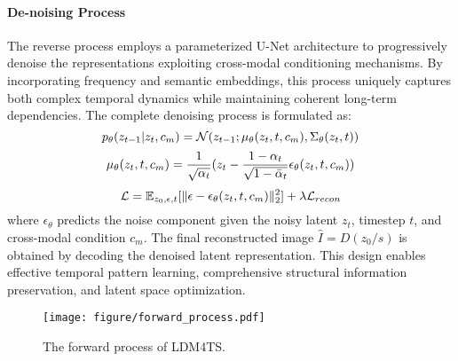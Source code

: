 \paragraph{De-noising Process}
The reverse process employs a parameterized U-Net architecture to progressively denoise the representations exploiting cross-modal conditioning mechanisms. By incorporating frequency and semantic embeddings, this process uniquely captures both complex temporal dynamics while maintaining coherent long-term dependencies. The complete denoising process is formulated as:
\begin{equation}
\small
    p_\theta(z_{t-1}|z_t,c_m) = \mathcal{N}(z_{t-1}; \mu_\theta(z_t,t,c_m), \Sigma_\theta(z_t,t))
\end{equation}
\begin{equation}
\small
    \mu_\theta(z_t,t,c_m) = \frac{1}{\sqrt{\alpha_t}}(z_t - \frac{1-\alpha_t}{\sqrt{1-\bar{\alpha}_t}}\epsilon_\theta(z_t,t,c_m))
\end{equation}
\begin{equation}
\small
    \mathcal{L} = \mathbb{E}_{z_0,\epsilon,t}[\|\epsilon - \epsilon_\theta(z_t,t,c_m)\|_2^2] + \lambda\mathcal{L}_{recon}
\end{equation}
where $\epsilon_\theta$ predicts the noise component given the noisy latent $z_t$, timestep $t$, and cross-modal condition $c_m$. The final reconstructed image $\hat{I} = D(z_0/s)$ is obtained by decoding the denoised latent representation. This design enables effective temporal pattern learning, comprehensive structural information preservation, and latent space optimization.
\begin{figure}[!t]
  \centering
  \texttt{[image: figure/forward\_process.pdf]}
  \caption{The forward process of LDM4TS.}
\label{fig:forward}
\end{figure}

